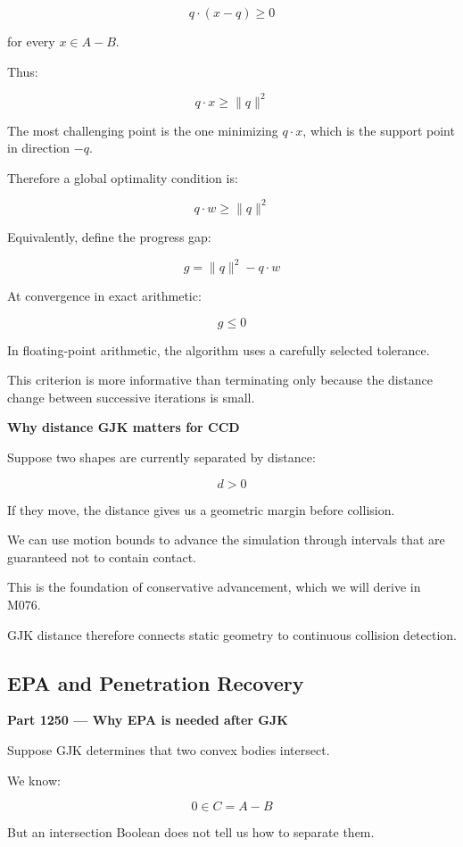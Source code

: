 \[
q\cdot(x-q)\ge0
\]

for every \(x\in A-B\).

Thus:

\[
q\cdot x\ge\|q\|^2
\]

The most challenging point is the one minimizing \(q\cdot x\), which is the support point in direction \(-q\).

Therefore a global optimality condition is:

\[
\boxed{ q\cdot w\ge\|q\|^2 }
\]

Equivalently, define the progress gap:

\[
\boxed{ g=\|q\|^2-q\cdot w }
\]

At convergence in exact arithmetic:

\[
g\le0
\]

In floating-point arithmetic, the algorithm uses a carefully selected tolerance.

This criterion is more informative than terminating only because the distance change between successive iterations is small.

\textbf{Why distance GJK matters for CCD}

Suppose two shapes are currently separated by distance:

\[
d>0
\]

If they move, the distance gives us a geometric margin before collision.

We can use motion bounds to advance the simulation through intervals that are guaranteed not to contain contact.

This is the foundation of conservative advancement, which we will derive in M076.

GJK distance therefore connects static geometry to continuous collision detection.

\subsection{EPA and Penetration Recovery}\label{04-visual-computing-ii-ch025-epa-and-penetration-recovery}

\hypertarget{04-visual-computing-ii-ch025-epa-and-penetration-recovery}{}

\textbf{Part 1250 --- Why EPA is needed after GJK}

Suppose GJK determines that two convex bodies intersect.

We know:

\[
0\in C=A-B
\]

But an intersection Boolean does not tell us how to separate them.

